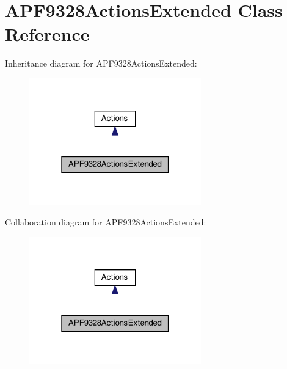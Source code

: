 \hypertarget{classAPF9328ActionsExtended}{}\section{A\+P\+F9328\+Actions\+Extended Class Reference}
\label{classAPF9328ActionsExtended}


Inheritance diagram for A\+P\+F9328\+Actions\+Extended\+:
\nopagebreak
\begin{figure}[H]
\begin{center}
\leavevmode
\includegraphics[width=211pt]{classAPF9328ActionsExtended__inherit__graph}
\end{center}
\end{figure}


Collaboration diagram for A\+P\+F9328\+Actions\+Extended\+:
\nopagebreak
\begin{figure}[H]
\begin{center}
\leavevmode
\includegraphics[width=211pt]{classAPF9328ActionsExtended__coll__graph}
\end{center}
\end{figure}
